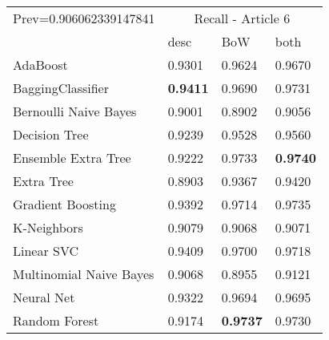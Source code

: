 \begin{tabular}{|l|l|l|l| }
\hline
Prev=0.906062339147841 &  \multicolumn{3}{c|}{Recall - Article 6} \\
\cline{2-4} & desc & BoW & both \\ \hline
AdaBoost                & 0.9301 & 0.9624 & 0.9670\\
BaggingClassifier       & {\bf 0.9411} & 0.9690 & 0.9731\\
Bernoulli Naive Bayes   & 0.9001 & 0.8902 & 0.9056\\
Decision Tree           & 0.9239 & 0.9528 & 0.9560\\
Ensemble Extra Tree     & 0.9222 & 0.9733 & {\bf 0.9740}\\
Extra Tree              & 0.8903 & 0.9367 & 0.9420\\
Gradient Boosting       & 0.9392 & 0.9714 & 0.9735\\
K-Neighbors             & 0.9079 & 0.9068 & 0.9071\\
Linear SVC              & 0.9409 & 0.9700 & 0.9718\\
Multinomial Naive Bayes & 0.9068 & 0.8955 & 0.9121\\
Neural Net              & 0.9322 & 0.9694 & 0.9695\\
Random Forest           & 0.9174 & {\bf 0.9737} & 0.9730\\
\hline
\end{tabular}